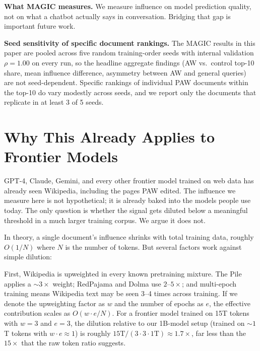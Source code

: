 \documentclass{article}
\begin{document}
\textbf{What MAGIC measures.} We measure influence on model prediction quality, not on what a chatbot actually says in conversation. Bridging that gap is important future work.

\textbf{Seed sensitivity of specific document rankings.} The MAGIC results in this paper are pooled across five random training-order seeds with internal validation $\rho = 1.00$ on every run, so the headline aggregate findings (AW vs.\ control top-10 share, mean influence difference, asymmetry between AW and general queries) are not seed-dependent. Specific rankings of individual PAW documents within the top-10 do vary modestly across seeds, and we report only the documents that replicate in at least 3 of 5 seeds.

\section{Why This Already Applies to Frontier Models}

GPT-4, Claude, Gemini, and every other frontier model trained on web data has already seen Wikipedia, including the pages PAW edited. The influence we measure here is not hypothetical; it is already baked into the models people use today. The only question is whether the signal gets diluted below a meaningful threshold in a much larger training corpus. We argue it does not.

In theory, a single document's influence shrinks with total training data, roughly $O(1/N)$ where $N$ is the number of tokens. But several factors work against simple dilution:

First, Wikipedia is upweighted in every known pretraining mixture. The Pile applies a ${\sim}3\times$ weight; RedPajama and Dolma use $2$--$5\times$; and multi-epoch training means Wikipedia text may be seen 3--4 times across training. If we denote the upweighting factor as $w$ and the number of epochs as $e$, the effective contribution scales as $O(w \cdot e / N)$. For a frontier model trained on 15T tokens with $w = 3$ and $e = 3$, the dilution relative to our 1B-model setup (trained on ${\sim}1$T tokens with $w \cdot e \approx 1$) is roughly $15\text{T} / (3 \cdot 3 \cdot 1\text{T}) \approx 1.7\times$, far less than the $15\times$ that the raw token ratio suggests.
\end{document}

